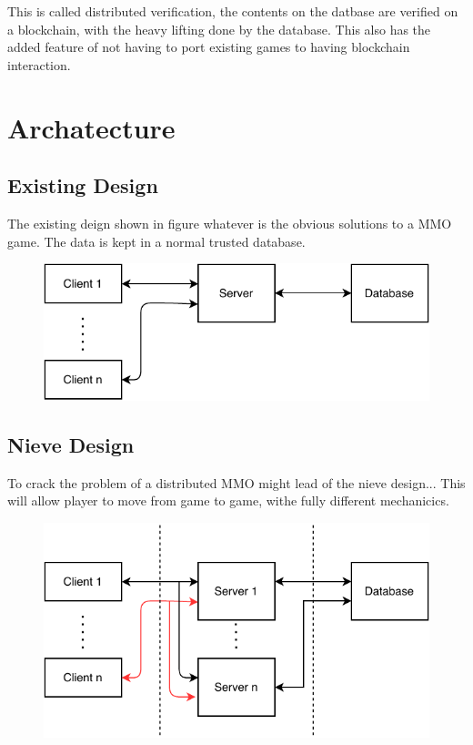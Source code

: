 \documentclass[runningheads,a4paper]{llncs}
\begin{document}
This is called distributed verification, the contents on the datbase are verified on
a blockchain, with the heavy lifting done by the database. This also has the added 
feature of not having to port existing games to having blockchain interaction.

\section{Archatecture}
\subsection{Existing Design}
The existing deign shown in figure whatever is the obvious solutions to a MMO game.
The data is kept in a normal trusted database.

\begin{figure}[H]
\includegraphics[scale=1]{img/traditional.pdf}
\end{figure}

\subsection{Nieve Design}
To crack the problem of a distributed MMO might lead of the nieve design... This
will allow player to move from game to game, withe fully different mechanicics. 

\begin{figure}[H]
\includegraphics[scale=1]{img/nieve.pdf}
\end{figure}
\end{document}
